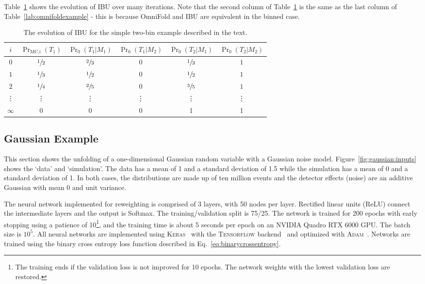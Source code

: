 Table~\ref{lab:ibuexample} shows the evolution of IBU over many iterations.  Note that the second column of Table~\ref{lab:ibuexample} is the same as the last column of Table~\ref{lab:omnifoldexample} - this is because OmniFold and IBU are equivalent in the binned case.

\begin{table}[h!]
\centering
\begin{tabular}{|cccccc| }
\hline
$i$ & $\Pr_\text{MC,$i$}(T_1)$ & $\Pr_0(T_1|M_1)$ & $\Pr_0(T_1|M_2)$ & $\Pr_0(T_2|M_1)$ & $\Pr_0(T_2|M_2)$\\
\hline
$0$ & $\sfrac{1}{2}$ & $\sfrac{2}{3}$ & 0 & $\sfrac{1}{3}$ & $1$\\
$1$ & $\sfrac{1}{3}$ & $\sfrac{1}{2}$ & 0 & $\sfrac{1}{2}$ & $1$\\
$2$ & $\sfrac{1}{4}$ & $\sfrac{2}{5}$ & 0 & $\sfrac{3}{5}$ & $1$\\
\vdots & \vdots & \vdots & \vdots & \vdots & \vdots  \\
$\infty$ & 0 & 0 & 0 & 1 & 1\\
\hline
\end{tabular}
\caption{The evolution of IBU for the simple two-bin example described in the text.}
\label{lab:ibuexample}
\end{table}

\subsection{Gaussian Example}
\label{sec:gaus}

This section shows the unfolding of a one-dimensional Gaussian random variable with a Gaussian noise model.  Figure~\ref{fig:gaussian:inputs} shows the `data' and `simulation'.  The data has a mean of 1 and a standard deviation of 1.5 while the simulation has a mean of 0 and a standard deviation of 1.  In both cases, the distributions are made up of ten million events and the detector effects (noise) are an additive Gaussian with mean 0 and unit variance.

The neural network implemented for reweighting is comprised of 3 layers, with 50 nodes per layer.  Rectified linear units (ReLU) connect the intermediate layers and the output is Softmax.  The training/validation split is 75/25.  The network is trained for 200 epochs with early stopping using a patience of 10\footnote{The training ends if the validation loss is not improved for 10 epochs.  The network weights with the lowest validation loss are restored.}, and the training time is about 5 seconds per epoch on an NVIDIA Quadro RTX 6000 GPU. The batch size is $10^5$.  All neural networks are implemented using \textsc{Keras}~\cite{keras} with the \textsc{Tensorflow} backend~\cite{tensorflow} and optimized with \textsc{Adam}~\cite{adam}.  Networks are trained using the binary cross entropy loss function described in Eq.~\ref{eq:binarycrossentropy}.

